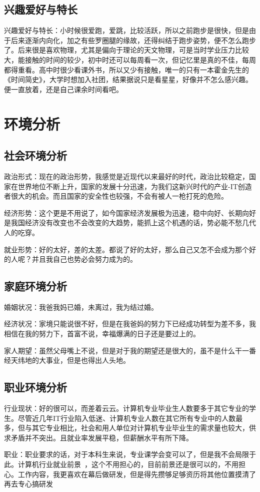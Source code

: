 \documentclass{article}
\begin{document}
\subsection{兴趣爱好与特长}
兴趣爱好与特长：小时候很爱跑，爱跳，比较活跃，所以之前跑步是很快，但是由于后来逐渐内向化，加之有些罗圈腿的缘故，还得纠结于跑步姿势，便不怎么跑步了。后来很是喜欢物理，尤其是偏向于理论的天文物理，可是当时学业压力比较大，能接触的时间的较少，初中时还可以每周看一次，但记忆里是真的不佳，每周都得重看。高中时很少看课外书，所以又少有接触，唯一的只有一本霍金先生的《时间简史》，大学时想加入社团，结果据说只是看星星，好像并不怎么感兴趣。便一直放着，还是自己课余时间看吧。\par
\section{环境分析}
\subsection{社会环境分析}
政治形式：现在的政治形势，我感觉是近现代以来最好的时代，政治比较稳定，国家在世界地位不断上升，国家的发展十分迅速，为我们这新兴时代的产业-IT创造者很大的机会。而且国家的安全性也较强，不会有被人一枪打死的危险。\par 
经济形势：这个更是不用说了，如今国家经济发展极为迅速，稳中向好、长期向好是我国经济没有改变也不会改变的大趋势，能抓上这个机遇的话，势必能不愁几代人的吃穿。\par 
就业形势：好的太好，差的太差。都说了好的太好，那么自己又怎不会成为那个好的人呢？并且我自己也势必会努力成为的。\par 
\subsection{家庭环境分析}
婚姻状况：我爸我妈已婚，未离过，我为结过婚。\par
经济状况：家境只能说很不好，但是在我爸妈的努力下已经成功转型为差不多，我相信在我的努力下，首富不说，幸福爆满的日子还是要过上的。\par
家人期望：虽然父母嘴上不说，但是对于我的期望还是很大的，虽不是什么干一番经天纬地的大事业，但是也得出人头地。\par
\subsection{职业环境分析}
行业现状：好的很可以，而差着云云。计算机专业毕业生人数要多于其它专业的学生。尽管近几年IT行业陷入低迷、计算机专业人数在其它所有专业中的人数最多，但与其它专业相比，社会和用人单位对计算机专业毕业生的需求量也较大，供求矛盾并不突出。且就业率发展平稳，但薪酬水平有所下降。\par 
职业：职业要求的话，对于本科生来说，专业课学会变可以了，但是我不会局限于此。计算机行业就业前景 ，这个不用担心的，目前前景还是很可以的，不用担心。工作内容，我更喜欢在幕后做研发，但是得先攒够足够资历将其他位置摸清了再去专心搞研发\par 
\end{document}

